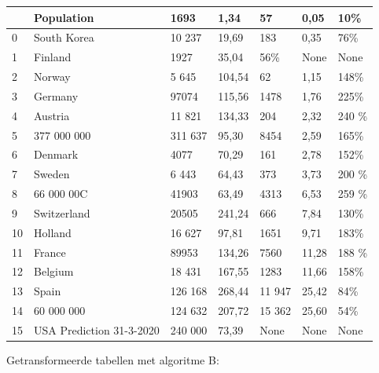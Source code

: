 \begin{tabular}{lllllll}
\toprule
{} &                Population &     1693 &    1,34 &      57 &   0,05 &    10\% \\
\midrule
0  &               South Korea &   10 237 &   19,69 &     183 &   0,35 &    76\% \\
1  &                   Finland &     1927 &   35,04 &     56\% &   None &   None \\
2  &                    Norway &    5 645 &  104,54 &      62 &   1,15 &   148\% \\
3  &                   Germany &    97074 &  115,56 &    1478 &   1,76 &   225\% \\
4  &                   Austria &   11 821 &  134,33 &     204 &   2,32 &  240 \% \\
5  &               377 000 000 &  311 637 &   95,30 &    8454 &   2,59 &   165\% \\
6  &                   Denmark &     4077 &   70,29 &     161 &   2,78 &   152\% \\
7  &                    Sweden &    6 443 &   64,43 &     373 &   3,73 &  200 \% \\
8  &                66 000 00C &    41903 &   63,49 &    4313 &   6,53 &  259 \% \\
9  &               Switzerland &    20505 &  241,24 &     666 &   7,84 &   130\% \\
10 &                   Holland &   16 627 &   97,81 &    1651 &   9,71 &   183\% \\
11 &                    France &    89953 &  134,26 &    7560 &  11,28 &  188 \% \\
12 &                   Belgium &   18 431 &  167,55 &    1283 &  11,66 &   158\% \\
13 &                     Spain &  126 168 &  268,44 &  11 947 &  25,42 &    84\% \\
14 &                60 000 000 &  124 632 &  207,72 &  15 362 &  25,60 &    54\% \\
15 &  USA Prediction 31-3-2020 &  240 000 &   73,39 &    None &   None &   None \\
\bottomrule
\end{tabular}

Getransformeerde tabellen met algoritme B:


